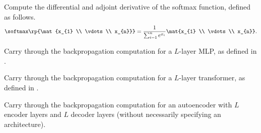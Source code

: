 \documentclass[../../book-main.tex]{subfiles}
\begin{document}
\begin{exercise}
    Compute the differential and adjoint derivative of the softmax function, defined as follows.
    \begin{equation}
        \softmax\rp{\mat{x_{1} \\ \vdots \\ x_{n}}} = \frac{1}{\sum_{i = 1}^{n}e^{x_{i}}}\mat{x_{1} \\ \vdots \\ x_{n}}.
    \end{equation}
\end{exercise}

\begin{exercise}
    Carry through the backpropagation computation for a \(L\)-layer MLP, as defined in .
\end{exercise}

\begin{exercise}
    Carry through the backpropagation computation for a \(L\)-layer transformer, as defined in .
\end{exercise}

\begin{exercise}
    Carry through the backpropagation computation for an autoencoder with \(L\) encoder layers and \(L\) decoder layers (without necessarily specifying an architecture).
\end{exercise}
\end{document}

